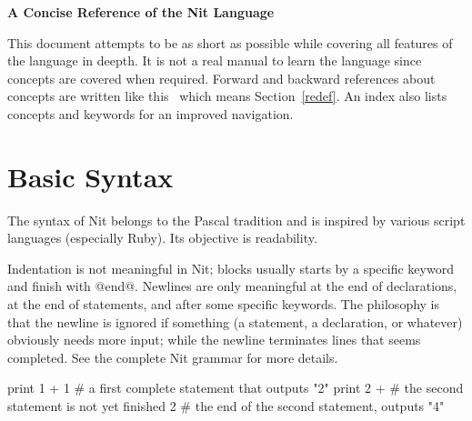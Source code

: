 %
%
%
%
\noindent\textbf{A Concise Reference of the Nit Language}

This document attempts to be as short as possible while covering all features of the language in deepth.
It is not a real manual to learn the language since concepts are covered when required.
Forward and backward references about concepts are written like this~ which means Section~\ref*{redef}.
An index also lists concepts and keywords for an improved navigation.

\section{Basic Syntax}\label{syntax}\label{end}

The syntax of Nit belongs to the Pascal tradition and is inspired by various script languages (especially Ruby).
Its objective is readability.

Indentation is not meaningful in Nit; blocks usually starts by a specific keyword and finish with @end@.
Newlines are only meaningful at the end of declarations, at the end of statements, and after some specific keywords.
The philosophy is that the newline is ignored if something (a statement, a declaration, or whatever) obviously needs more input; while the newline terminates lines that seems completed.
See the complete Nit grammar for more details.

\begin{lst}
print 1 + 1 # a first complete statement that outputs "2"
print 2 + # the second statement is not yet finished
2 # the end of the second statement, outputs "4"
\end{lst}

